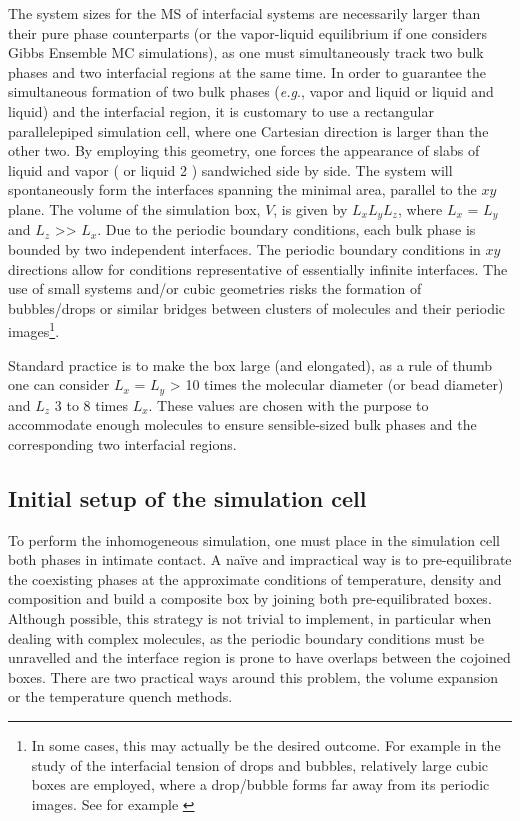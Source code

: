 \documentclass[9pt,tutorial]{livecoms}
\begin{document}
The system sizes for the MS of interfacial systems are necessarily larger than
their pure phase counterparts (or the vapor-liquid equilibrium if one considers
Gibbs Ensemble MC simulations), as one must simultaneously track two bulk phases and two
interfacial regions at the same time. In order to guarantee the simultaneous
formation of two bulk phases (\textit{e.g}., vapor and liquid or liquid and
liquid) and the interfacial region, it is customary to use a rectangular
parallelepiped simulation cell, where one Cartesian direction is larger than
the other two. By employing this geometry, one forces the appearance of slabs
of liquid and vapor ( or liquid 2 ) sandwiched side by side. The system will
spontaneously form the interfaces spanning the minimal area, parallel to the
$xy$ plane. The volume of the simulation box, $V$, is given by
$L_{x}L_{y}L_{z}$, where $L_{x}$
= $L_{y}$ and $L_{z}$ {\textgreater}{\textgreater}
$L_{x}$. Due to the periodic boundary conditions, each bulk phase is
bounded by two independent interfaces. The periodic boundary conditions in $xy$ directions
allow for conditions representative of essentially infinite interfaces. The use of
small systems and/or cubic geometries risks the formation of bubbles/drops or
similar bridges between clusters of molecules and their periodic
images\footnote{In some cases, this may actually be the desired outcome.
For example in the study of the interfacial tension of drops and bubbles,
relatively large cubic boxes are employed, where a drop/bubble forms 
far away from its periodic images. See for example \citep{lau2015}}.

Standard practice is to make the box large (and elongated), as a rule of thumb one can consider
$L_{x}$ = $L_{y}$ {\textgreater} 10 times the molecular
diameter (or bead diameter) and $L_{z}$ 3 to 8 times
$L_{x}$. These values are chosen with the purpose to accommodate
enough molecules to ensure sensible-sized bulk phases and the corresponding two
interfacial regions. 

\subsection{Initial setup of the simulation cell}

To perform the inhomogeneous simulation, one must place in the simulation cell
both phases in intimate contact. A na\"{i}ve and impractical way is to
pre-equilibrate the coexisting phases at the approximate conditions of
temperature, density and composition and build a composite box by joining both
pre-equilibrated boxes. Although possible, this strategy is not trivial to
implement, in particular when dealing with complex molecules, as the periodic
boundary conditions must be unravelled and the interface region is prone to
have overlaps between the cojoined boxes. There are two practical ways around
this problem, the volume expansion or the temperature quench methods. 
\end{document}
